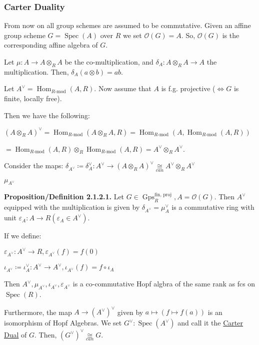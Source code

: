 \documentclass{article}
\theoremstyle{definition}
\numberwithin{theorem}{subsection}
\begin{document}
    \subsubsection{Carter Duality}

    From now on all group schemes are assumed to be commutative. Given an affine group scheme \(G = \operatorname{Spec}(A)\) over \(R\) we set \(\mathcal{O}(G) = A\). So, \(\mathcal{O}(G)\) is the corresponding affine algebra of \(G\).
    
    Let \(\mu:A \to A\otimes_R A\) be the co-multiplication, and \(\delta_A : A \otimes_R A \to A\) the multiplication. Then, \(\delta_A(a \otimes b) = ab\).

    Let \(A^\vee = \operatorname{Hom}_{R\text{-mod}}(A,R)\). Now assume that \(A\) is f.g. projective (\(\iff G\) is finite, locally free).
    
    Then we have the following:
    
    \((A \otimes_R A)^\vee = \operatorname{Hom}_{R\text{-mod}}(A \otimes_R A, R) = \operatorname{Hom}_{R\text{-mod}}(A, \operatorname{Hom}_{R\text{-mod}}(A,R))\) 

    \(= \operatorname{Hom}_{R\text{-mod}}(A,R) \otimes_R \operatorname{Hom}_{R\text{-mod}}(A,R) = A^\vee \otimes_R A^\vee\).

    Consider the maps: \(\delta_{A^\vee}\coloneqq \delta_A^\vee: A^\vee \to (A \otimes_R A)^\vee \underset{can}{\cong} A^\vee \otimes_R A^\vee\)
    
    \(\mu_{A^\vee}\) 

    \textbf{Proposition/Definition 2.1.2.1.} Let \(G \in \operatorname{Gps}_R^{\text{fin, proj}}, A = \mathcal{O}(G)\). Then \(A^\vee\) equipped with the multiplication is given by \(\delta_{A^\vee} = \mu_A^\vee\) is a commutative ring with unit \(\varepsilon_A: A \to R (\varepsilon_A \in A^\vee)\).
    
    If we define:
    
    \(\varepsilon_{A^\vee}: A^\vee \to R, \varepsilon_{A^\vee}(f) = f(0)\)
    
    \(\iota_{A^\vee} \coloneqq \iota_A^\vee: A^\vee\to A^\vee, \iota_{A^\vee}(f) = f \circ \iota_A\)
    
    Then \(A^\vee, \mu_{A^\vee},\iota_{A^\vee},\varepsilon_{A^\vee}\) is a co-commutative Hopf algbra of the same rank as fcs on \(\operatorname{Spec}(R)\).

    Furthermore, the map \(A \to (A^\vee)^{\vee}\) given by \(a \mapsto (f \mapsto f(a))\) is an isomorphism of Hopf Algebras. We set \(G^\vee: \operatorname{Spec}(A^\vee)\) and call it the \underline{Carter Dual} of \(G\). Then, \((G^\vee)^\vee\underset{can}{\cong} G\).  
    
\end{document}
